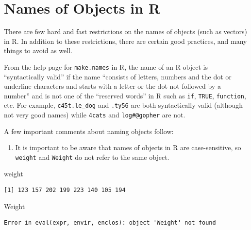 \documentclass[
]{krantz}
\makeatletter
\newenvironment{Shaded}{\begin{snugshade}}{\end{snugshade}}
\newcommand{\NormalTok}[1]{#1}
\providecommand{\tightlist}{%
  \setlength{\itemsep}{0pt}\setlength{\parskip}{0pt}}
\newenvironment{kframe}{%
\medskip{}
\setlength{\fboxsep}{.8em}
 \def\at@end@of@kframe{}%
 \ifinner\ifhmode%
  \def\at@end@of@kframe{\end{minipage}}%
  \begin{minipage}{\columnwidth}%
 \fi\fi%
 \def\FrameCommand##1{\hskip\@totalleftmargin \hskip-\fboxsep
 \colorbox{shadecolor}{##1}\hskip-\fboxsep
     \hskip-\linewidth \hskip-\@totalleftmargin \hskip\columnwidth}%
 \MakeFramed {\advance\hsize-\width
   \@totalleftmargin\z@ \linewidth\hsize
   \@setminipage}}%
 {\par\unskip\endMakeFramed%
 \at@end@of@kframe}
\renewenvironment{Shaded}{\begin{kframe}}{\end{kframe}}
\makeatother
\begin{document}
\hypertarget{names-of-objects-in-r}{%
\section{Names of Objects in R}\label{names-of-objects-in-r}}

There are few hard and fast restrictions on the names of objects (such as vectors) in R. In addition to these restrictions, there are certain good practices, and many things to avoid as well.

From the help page for \texttt{make.names} in R, the name of an R object is ``syntactically valid'' if the name ``consists of letters, numbers and the dot or underline characters and starts with a letter or the dot not followed by a number'' and is not one of the ``reserved words'' in R such as \texttt{if}, \texttt{TRUE}, \texttt{function}, etc. For example, \texttt{c45t.le\_dog} and \texttt{.ty56} are both syntactically valid (although not very good names) while \texttt{4cats} and \texttt{log\#@gopher} are not.

A few important comments about naming objects follow:

\begin{enumerate}
\def\labelenumi{\arabic{enumi}.}
\tightlist
\item
  It is important to be aware that names of objects in R are case-sensitive, so \texttt{weight} and \texttt{Weight} do not refer to the same object.
\end{enumerate}

\begin{Shaded}
\begin{Highlighting}[]
\NormalTok{weight}
\end{Highlighting}
\end{Shaded}

\begin{verbatim}
[1] 123 157 202 199 223 140 105 194
\end{verbatim}

\begin{Shaded}
\begin{Highlighting}[]
\NormalTok{Weight}
\end{Highlighting}
\end{Shaded}

\begin{verbatim}
Error in eval(expr, envir, enclos): object 'Weight' not found
\end{verbatim}
\end{document}
